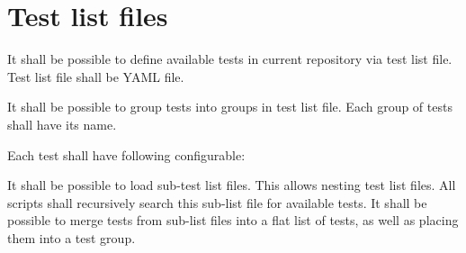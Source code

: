 \documentclass{tropic_design_spec}
\begin{document}

\ReqEnd



\pagebreak
\section{Test list files}



    {It shall be possible to define available tests in current repository via test list
     file. Test list file shall be YAML file.}
     

    {It shall be possible to group tests into groups in test list file. Each group of
     tests shall have its name.}


    {Each test shall have following configurable:}
\ReqSubStart
\ReqSubEnd


    {It shall be possible to load sub-test list files. This allows nesting test list
     files. All scripts shall recursively search this sub-list file for available tests.
     It shall be possible to merge tests from sub-list files into a flat list of tests,
     as well as placing them into a test group.}


\ReqEnd


\pagebreak
\end{document}
